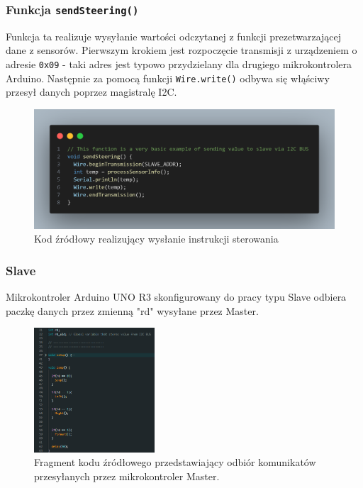 \documentclass{report}
\begin{document}
\newpage

\subsubsection*{Funkcja \texttt{sendSteering()}}

Funkcja ta realizuje wysyłanie wartości odczytanej z funkcji prezetwarzającej dane z sensorów. Pierwszym krokiem jest rozpoczęcie transmisji z urządzeniem o adresie \texttt{0x09} - taki adres jest typowo przydzielany dla drugiego mikrokontrolera Arduino. Następnie za pomocą funkcji \texttt{Wire.write()} odbywa się włąściwy przesył danych poprzez magistralę I2C.

\begin{figure}[H]
    \centering
    \includegraphics[width=1.0\textwidth]{src/code_snaps/sendSteer.png}
    \caption{Kod źródłowy realizujący wysłanie instrukcji sterowania}
\end{figure}

\subsubsection{\Large Slave}

Mikrokontroler Arduino UNO R3 skonfigurowany do pracy typu Slave odbiera paczkę danych przez zmienną "rd" wysyłane przez Master.

\begin{figure}[H]
    \centering
    \includegraphics*[width=0.4\textwidth]{"src/code_snaps/Comunication_slave.png"}
    \caption{Fragment kodu źródłowego przedstawiający odbiór komunikatów przesyłanych przez mikrokontroler Master.}
    \label{fig:sensor_init}
\end{figure}
\end{document}
